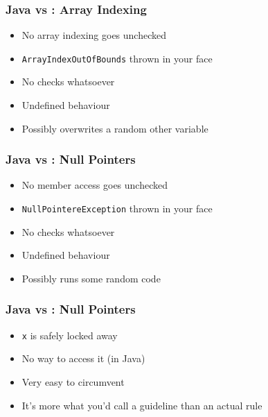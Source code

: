 \begin{frame}
  \frametitle{Java vs \cpp: Array Indexing}
  \begin{itemize}
    \item No array indexing goes unchecked
    \item \texttt{ArrayIndexOutOfBounds} thrown in your face
  \end{itemize}
  \vskip2mm
  \structure{\cpp}
  \begin{itemize}
    \item No checks whatsoever
    \item Undefined behaviour
    \item Possibly overwrites a random other variable
  \end{itemize}
\end{frame}

\begin{frame}
  \frametitle{Java vs \cpp: Null Pointers}
  \begin{itemize}
    \item No member access goes unchecked
    \item \texttt{NullPointereException} thrown in your face
  \end{itemize}
  \vskip2mm
  \structure{\cpp}
  \begin{itemize}
    \item No checks whatsoever
    \item Undefined behaviour
    \item Possibly runs some random code
  \end{itemize}
\end{frame}

\begin{frame}
  \frametitle{Java vs \cpp: Null Pointers}
  \begin{itemize}
    \item \texttt{x} is safely locked away
    \item No way to access it (in Java)
  \end{itemize}
  \vskip2mm
  \structure{\cpp}
  \begin{itemize}
    \item Very easy to circumvent
    \item It's more what you'd call a guideline than an actual rule
  \end{itemize}
\end{frame}

